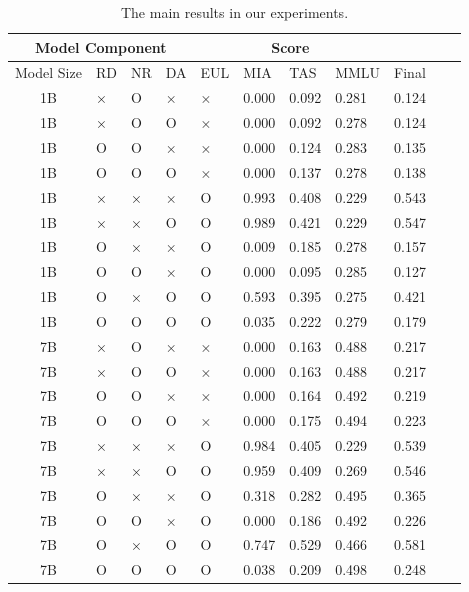 \documentclass[11pt]{article}
\begin{document}
\begin{table}[!t]
  \centering
    \begin{tabular}{c|llll|llllll}
    \hline
    \multicolumn{4}{c}{\textbf{Model Component}} & \multicolumn{4}{c}{\textbf{Score}} \\ \hline
       Model Size & RD & NR & DA & EUL & MIA & TAS & MMLU & Final \\ \hline
       1B & × & O & × & × & 0.000 & 0.092 & 0.281 & 0.124 \\ \hline
       1B & × & O & O & × & 0.000 & 0.092 & 0.278 & 0.124 \\ \hline
       1B & O & O & × & × & 0.000 & 0.124 & 0.283 & 0.135 \\ \hline
       1B & O & O & O & × & 0.000 & 0.137 & 0.278 & 0.138 \\ \hline
       1B & × & × & × & O & 0.993 & 0.408 & 0.229 & 0.543 \\ \hline
       1B & × & × & O & O & 0.989 & 0.421 & 0.229 & 0.547 \\ \hline
       1B & O & × & × & O & 0.009 & 0.185 & 0.278 & 0.157 \\ \hline
       1B & O & O & × & O & 0.000 & 0.095 & 0.285 & 0.127 \\ \hline
       1B & O & × & O & O & 0.593 & 0.395 & 0.275 & 0.421 \\ \hline
       1B & O & O & O & O & 0.035 & 0.222 & 0.279 & 0.179 \\ \hline

       7B & × & O & × & × & 0.000 & 0.163 & 0.488 & 0.217 \\ \hline
       7B & × & O & O & × & 0.000 & 0.163 & 0.488 & 0.217 \\ \hline
       7B & O & O & × & × & 0.000 & 0.164 & 0.492 & 0.219 \\ \hline
       7B & O & O & O & × & 0.000 & 0.175 & 0.494 & 0.223 \\ \hline
       7B & × & × & × & O & 0.984 & 0.405 & 0.229 & 0.539 \\ \hline
       7B & × & × & O & O & 0.959 & 0.409 & 0.269 & 0.546 \\ \hline
       7B & O & × & × & O & 0.318 & 0.282 & 0.495 & 0.365 \\ \hline
       7B & O & O & × & O & 0.000 & 0.186 & 0.492 & 0.226 \\ \hline
       7B & O & × & O & O & 0.747 & 0.529 & 0.466 & 0.581 \\ \hline
       7B & O & O & O & O & 0.038 & 0.209 & 0.498 & 0.248 \\ \hline
    \end{tabular}
  \caption{
    The main results in our experiments.
  }
  \label{tab:AS2}
\end{table}
\end{document}
